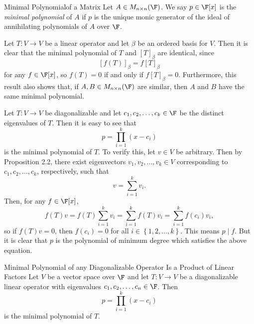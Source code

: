 \documentclass[linearalgebraII]{subfiles}
\begin{document}
    \begin{definition}{Minimal Polynomial}{of a Matrix}
        Let $A\in M_{n\times n}(\F)$. We say $p\in\F[x]$ is the \emph{minimal polynomial} of $A$ if $p$ is the unique monic generator of the ideal of annihilating polynomials of $A$ over $\F$.
    \end{definition}

    \begin{remark}
        Let $T:V\to V$ be a linear operator and let $\beta$ be an ordered basis for $V$. Then it is clear that the minimal polynomial of $T$ and $\left[ T \right] _\beta$ are identical, since
        \begin{equation*}
            \left[ f(T) \right] _\beta = f\left[ T \right] _\beta
        \end{equation*}
        for any $f\in\F[x]$, so $f(T)=0$ if and only if $f\left[ T \right] _\beta=0$. Furthermore, this result also shows that, if $A, B\in M_{n\times n}(\F)$ are similar, then $A$ and $B$ have the same minimal polynomial. 
    \end{remark}

    \begin{remark}
        Let $T:V\to V$ be diagonalizable and let $c_1,c_2,\ldots,c_k\in\F$ be the distinct eigenvalues of $T$. Then it is easy to see that
        \begin{equation*}
            p = \prod^{k}_{i=1} \left( x-c_i \right) 
        \end{equation*}
        is the minimal polynomial of $T$. To verify this, let $v\in V$ be arbitrary. Then by Proposition 2.2, there exist eigenvectors $v_1,v_2,\ldots,v_k\in V$ corresponding to $c_1,c_2,\ldots,c_k$, respectively, such that
        \begin{equation*}
            v = \sum^{k}_{i=1} v_i.
        \end{equation*}
        Then, for any $f\in\F[x]$,
        \begin{equation*}
            f(T)v = f(T)\sum^{k}_{i=1} v_i = \sum^{k}_{i=1} f(T)v_i = \sum^{k}_{i=1} f\left( c_i \right) v_i,
        \end{equation*}
        so if $f(T)v = 0$, then $f\left( c_i \right) =0$ for all $i\in\left\lbrace 1,2,\ldots,k \right\rbrace$. This means $p\mid f$. But it is clear that $p$ is the polynomial of minimum degree which satisfies the above equation.
    \end{remark}

    \begin{prop}{Minimal Polynomial of any Diagonalizable Operator Is a Product of Linear Factors}
        Let $V$ be a vector space over $\F$ and let $T:V\to V$ be a diagonalizable linear operator with eigenvalues $c_1, c_2, \ldots, c_n\in \F$. Then
        \begin{equation*}
            p = \prod^{k}_{i=1} \left( x-c_i \right) 
        \end{equation*}
        is the minimal polynomial of $T$.
    \end{prop}
\end{document}
